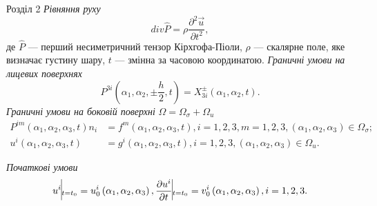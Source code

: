 \documentclass[8pt]{beamer}
\numberwithin{figure}{section}
\numberwithin{equation}{section}
\numberwithin{table}{section}
\begin{document}
\begin{frame}{Розділ 2}
\emph{Рівняння руху}\\
\vspace{1em}
\begin{equation} \label{eq:P}
div \hat{P} = \rho \frac{\partial^2 \vec{u}}{\partial t^2},
\end{equation}
де $\hat{P}$ --- перший несиметричний тензор Кірхгофа-Піоли, $\rho$ --- скалярне поле, яке визначає густину шару, $t$ --- змінна за часовою координатою.
\linebreak 
\linebreak 
\emph{Граничні умови на лицевих поверхнях}
\begin{equation}
P^{3i}\left( \alpha_1, \alpha_2, \pm \frac{h}{2}, t \right) = X^{\pm}_{3i}\left( \alpha_1, \alpha_2, t \right).
\end{equation}
\linebreak
\emph{Граничні умови на боковій поверхні} $\Omega = \Omega_{\sigma} + \Omega_{u} $
\begin{align}
P^{im}\left( \alpha_1, \alpha_2, \alpha_3, t \right)n_i &= f^{m}\left( \alpha_1, \alpha_2, \alpha_3, t \right), i=1,2,3, m=1,2,3, \left( \alpha_1, \alpha_2,\alpha_3\right)\in\Omega_{\sigma};\\
u^{i}\left( \alpha_1, \alpha_2, \alpha_3, t \right) &=g^{i}\left( \alpha_1, \alpha_2, \alpha_3, t \right), i=1,2,3, \left( \alpha_1, \alpha_2,\alpha_3\right)\in\Omega_{u}.
\end{align}

\emph{Початкові умови}
\begin{equation}
u^{i}\vline _{t=t_0} = u^i_0 \left( \alpha_1, \alpha_2, \alpha_3 \right), \frac{\partial u^{i}}{\partial t}\vline _{t=t_0} =v^i_0 \left( \alpha_1, \alpha_2, \alpha_3 \right), i=1,2,3.
\end{equation}

\end{frame}
\end{document}

